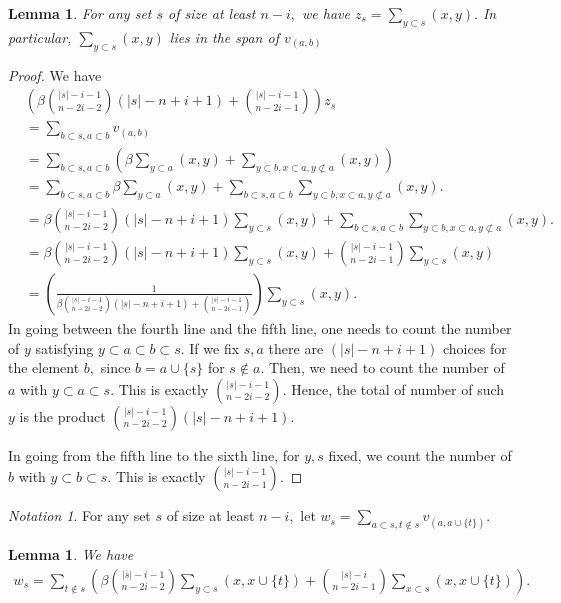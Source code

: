 \documentclass[10 pt]{amsart}
\theoremstyle{plain}
\newtheorem{lem}[thm]{Lemma}
\theoremstyle{definition}
\theoremstyle{remark}
\newtheorem{note}[thm]{Notation}
\numberwithin{equation}{section}
\begin{document}
\begin{lem}
\label{z_equivalence}
For any set $s$ of size at least $n-i,$ we have $z_s = \sum_{y \subset s}^{}(x, y).$ In particular, $\sum_{y \subset s}^{}(x, y)$ lies in the span of $v_{(a, b)}$
\end{lem}
\begin{proof}
We have 
\begin{align*}
  &\left(\beta\binom {|s|-i-1}{n-2i-2}(|s|-n+i+1)+\binom{|s|-i-1}{n-2i-1}\right) z_s \\
  &= \sum_{b\subset s,a \subset b}^{}v_{(a, b)}\\
  &=\sum_{b\subset s,a \subset b}^{} \left(\beta \sum_{y \subset a}^{}(x, y) + \sum_{y\subset b,x \subset a,y\not\subset a}^{}(x, y)\right)\\
  &= \sum_{b\subset s,a \subset b}^{} \beta \sum_{y \subset a}^{}(x, y) + \sum_{b\subset s,a \subset b}^{} \sum_{y\subset b,x \subset a,y\not\subset a}^{}(x, y).\\
  &= \beta\binom {|s|-i-1}{n-2i-2}(|s|-n+i+1) \sum_{y \subset s}^{}(x ,y)+ \sum_{b\subset s,a \subset b}^{} \sum_{y\subset b,x \subset a,y\not\subset a}^{}(x, y).\\
  &= \beta\binom {|s|-i-1}{n-2i-2}(|s|-n+i+1) \sum_{y \subset s}^{}(x ,y) + \binom{|s|-i-1}{n-2i-1}\sum_{y\subset s}^{}(x, y)\\
  & =\left(\frac{1}{\beta\binom {|s|-i-1}{n-2i-2}(|s|-n+i+1)+\binom{|s|-i-1}{n-2i-1}}\right) \sum_{y \subset s}^{}(x,y).
\end{align*}
In going between the fourth line and the fifth line, one needs to count the number of $y$ satisfying $y \subset a \subset b\subset s.$ If we fix $s,a$ there are $(|s|-n+i+1)$ choices for the element $b,$ since $b = a \cup \{s\}$ for $s \notin a.$ Then, we need to count the number of $a$ with $y \subset a \subset s.$ This is exactly $\binom {|s|-i-1}{n-2i-2}.$ Hence, the total of number of such $y$ is the product $\binom {|s|-i-1}{n-2i-2}(|s|-n+i+1).$

In going from the fifth line to the sixth line, for $y,s$ fixed, we count the number of $b$ with $y \subset b \subset s.$ This is exactly $\binom{|s|-i-1}{n-2i-1}$.
\end{proof}

\begin{note}
For any set $s$ of size at least $n-i,$ let $w_s = \sum_{a \subset s,t\notin s}^{}v_{(a, a \cup \{t\})}.$
\end{note}

\begin{lem}
\label{w_equivalence}
We have 
\begin{align*}
  w_s = \sum_{t\notin s}^{} \left(\beta \binom {|s|-i-1}{n-2i-2}  \sum_{y \subset s}^{}(x, x \cup \{t\})  + \binom {|s|-i}{n-2i-1} \sum_{x \subset s}^{}(x ,x \cup \{t\}) \right).
\end{align*}
\end{lem}
\end{document}
